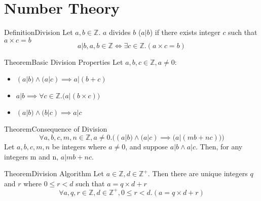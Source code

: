\documentclass{MathNotes}
\newenvironment{definition}[1]{\begin{RedBox}{Definition}{#1}}{\end{RedBox}}
\newenvironment{theorem}[1]{\begin{GrayBox}{Theorem}{#1}}{\end{GrayBox}}
\begin{document}
\newpage
\section{Number Theory}
\begin{definition}{Division}\label{def:division}
	Let $a,b\in\mathbb{Z}$. $a$ divides $b$ ($a|b$) if there exists integer $c$ such that $a\times c=b$
	\[a|b,a,b\in\mathbb{Z}\iff\exists c\in\mathbb{Z}.(a\times c=b)\]
\end{definition}

\begin{theorem}{Basic Division Properties}
	Let $a,b,c\in\mathbb{Z},a\neq 0$:
	\begin{itemize}
		\item $\displaystyle (a|b)\land(a|c)\implies a|(b+c)$
		\item $\displaystyle a|b\implies \forall c\in\mathbb{Z}.\big(a|(b\times c)\big)$
		\item $\displaystyle (a|b)\land(b|c)\implies a|c$
	\end{itemize}
\end{theorem}

\begin{theorem}{Consequence of Division}
	\[\forall a,b,c,m,n\in\mathbb{Z},a\neq0.\Big((a|b)\land(a|c)\implies\big(a|(mb+nc)\big)\Big)\]
	Let $a,b,c,m,n$ be integers where $a\neq0$, and suppose $a|b\land a|c$.
	Then, for any integers m and n, $a|mb+nc$.
\end{theorem}

\begin{theorem}{Division Algorithm}
	Let $a\in\mathbb{Z},d\in\mathbb{Z}^+$. Then there are unique integers $q$
	and $r$ where $0\leq r<d$ such that $a=q\times d+r$
	\[\forall a,q,r\in\mathbb{Z},d\in\mathbb{Z}^+,0\leq r<d.(a=q\times d+r)\]
\end{theorem}
\end{document}
